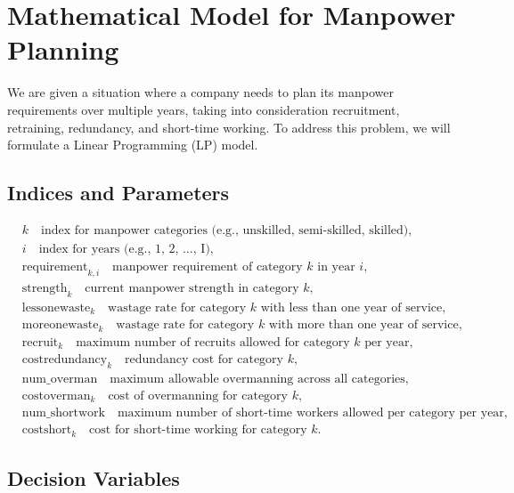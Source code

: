 \documentclass{article}
\begin{document}
\section*{Mathematical Model for Manpower Planning}

We are given a situation where a company needs to plan its manpower requirements over multiple years, taking into consideration recruitment, retraining, redundancy, and short-time working. To address this problem, we will formulate a Linear Programming (LP) model.

\subsection*{Indices and Parameters}

\begin{align*}
    & k \quad \text{index for manpower categories (e.g., unskilled, semi-skilled, skilled)}, \\
    & i \quad \text{index for years (e.g., 1, 2, \ldots, I)}, \\
    & \text{requirement}_{k, i} \quad \text{manpower requirement of category } k \text{ in year } i, \\
    & \text{strength}_{k} \quad \text{current manpower strength in category } k, \\
    & \text{lessonewaste}_{k} \quad \text{wastage rate for category } k \text{ with less than one year of service}, \\
    & \text{moreonewaste}_{k} \quad \text{wastage rate for category } k \text{ with more than one year of service}, \\
    & \text{recruit}_{k} \quad \text{maximum number of recruits allowed for category } k \text{ per year}, \\
    & \text{costredundancy}_{k} \quad \text{redundancy cost for category } k, \\
    & \text{num\_overman} \quad \text{maximum allowable overmanning across all categories}, \\
    & \text{costoverman}_{k} \quad \text{cost of overmanning for category } k, \\
    & \text{num\_shortwork} \quad \text{maximum number of short-time workers allowed per category per year}, \\
    & \text{costshort}_{k} \quad \text{cost for short-time working for category } k.
\end{align*}

\subsection*{Decision Variables}
\end{document}
